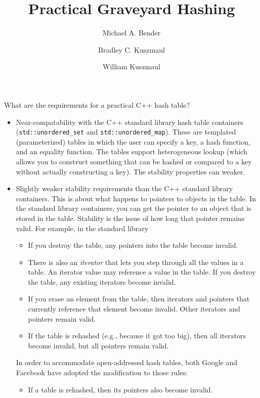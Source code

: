 \documentclass[10pt]{article}
\title{Practical Graveyard Hashing}
\author{Michael A. Bender \and
        Bradley C. Kuszmaul \and
        William Kuszmaul}
\theoremstyle{remark}
\theoremstyle{remark}
\begin{document}
\maketitle

What are the requirements for a practical C++ hash table?
\begin{itemize}
\item Near-compatability with the C++ standard library hash table
  containers (\texttt{std::unordered\_set} and
  \texttt{std::unordered\_map}).  These are templated (parameterized)
  tables in which the user can specify a key, a hash function, and an
  equality function.  The tables support heterogeneous lookup (which
  allows you to construct something that can be hashed or compared to
  a key without actually constructing a key).  The stability
  properties can weaker.
    
\item Slightly weaker stability requirements than the C++ standard library containers.  This is about what happens to pointers to objects in the table.  In the standard library containers, you can get the pointer to an object that is stored in the table. Stability is the issue of how long that pointer remains valid.  For example, in the standard library
  \begin{itemize}
    \item If you destroy the table, any pointers into the table become invalid.
    \item There is also an \textit{iterator} that lets you step
      through all the values in a table.  An iterator value may
      reference a value in the table.  If you destroy the table, any
      existing iterators become invalid.
    \item If you erase an element from the table, then iterators and
      pointers that currently reference that element become invalid.
      Other iterators and pointers remain valid.
    \item If the table is rehashed (e.g., because it got too big),
      then all iterators become invalid, but all pointers remain valid.
   \end{itemize}

  In order to accommodate open-addressed hash tables, both Google and
  Facebook have adopted the modification to those rules:
  \begin{itemize}
  \item  If a table is rehashed, then its pointers also become invalid.
  \end{itemize}


\end{itemize}
\end{document}
